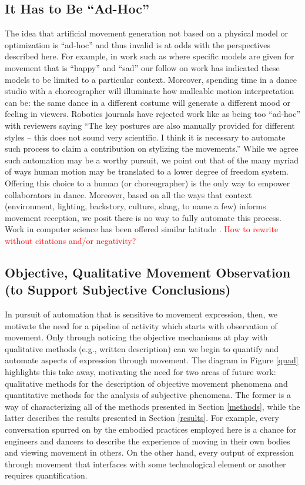 \documentclass[arts,article,submit,moreauthors,pdftex,10pt,a4paper]{mdpi}
\begin{document}
\subsection{It Has to Be ``Ad-Hoc''}
The idea that artificial movement generation not based on a physical model or optimization is ``ad-hoc'' and thus invalid is at odds with the perspectives described here.  For example, in work such as  \cite{knight2014expressive,etemad2016expert} where specific models are given for movement that is ``happy'' and ``sad'' our follow on work \cite{madi2017ICSR} has indicated these models to be limited to a particular context.  Moreover, spending time in a dance studio with a choreographer will illuminate how malleable motion interpretation can be: the same dance in a different costume will generate a different mood or feeling in viewers.  Robotics journals have rejected work like \cite{laviers2014controlsCH} as being too ``ad-hoc'' with reviewers saying ``The key postures are also manually provided for different styles -- this does not sound very scientific.  I think it is necessary to automate such process to claim a contribution on stylizing the movements.''  While we agree such automation may be a worthy pursuit, we point out that of the many myriad of ways human motion may be translated to a lower degree of freedom system.  Offering this choice to a human (or choreographer) is the only way to empower collaborators in dance.  Moreover, based on all the ways that context (environment, lighting, backstory, culture, slang, to name a few) informs movement reception, we posit there is no way to fully automate this process.  Work in computer science has been offered similar latitude \cite{hudak}. \textcolor{red}{How to rewrite without citations and/or negativity?}

\subsection{Objective, Qualitative Movement Observation (to Support Subjective Conclusions)}
In pursuit of automation that is sensitive to movement expression, then, we motivate the need for a pipeline of activity which starts with observation of movement.  Only through noticing the objective mechanisms at play with qualitative methods (e.g., written description) can we begin to quantify and automate aspects of expression through movement.  The diagram in Figure \ref{quad} highlights this take away, motivating the need for two areas of future work: qualitative methods for the description of objective movement phenomena and quantitative methods for the analysis of subjective phenomena.  The former is a way of characterizing all of the methods presented in Section \ref{methods}, while the latter describes the results presented in Section \ref{results}.  For example, every conversation spurred on by the embodied practices employed here is a chance for engineers and dancers to describe the experience of moving in their own bodies and viewing movement in others.  On the other hand, every output of expression through movement that interfaces with some technological element or another requires quantification.  
\end{document}
